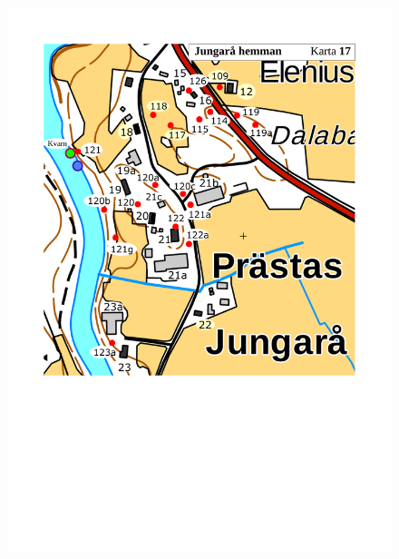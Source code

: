 \begin{figure}[htbp]
  \centering
  \includegraphics[width=1\textwidth]{kartor/Karta17.pdf}
  \label{map:17}
\end{figure}

\restoregeometry
